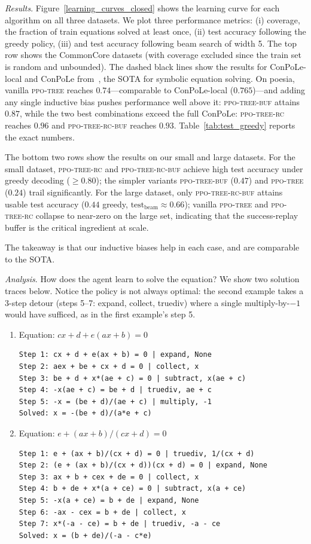 \documentclass{article}
\theoremstyle{plain}
\theoremstyle{definition}
\theoremstyle{remark}
\begin{document}
\textit{Results}. Figure~\ref{learning_curves_closed} shows the learning curve for each algorithm on all three datasets. We plot three performance metrics: (i) coverage, the fraction of train equations solved at least once, (ii) test accuracy following the greedy policy, (iii) and test accuracy following beam search of width 5. The top row shows the CommonCore datasets (with coverage excluded since the train set is random and unbounded). The dashed black lines show the results for ConPoLe-local and ConPoLe from~\cite{poesia2021contrastive}, the SOTA for symbolic equation solving. On poesia, vanilla \textsc{ppo-tree} reaches $0.74$---comparable to ConPoLe-local ($0.765$)---and adding any single inductive bias pushes performance well above it: \textsc{ppo-tree-buf} attains $0.87$, while the two best combinations exceed the full ConPoLe: \textsc{ppo-tree-rc} reaches $0.96$ and \textsc{ppo-tree-rc-buf} reaches $\mathbf{0.93}$. Table~\ref{tab:test_greedy} reports the exact numbers. 

The bottom two rows show the results on our small and large datasets. For the small dataset, \textsc{ppo-tree-rc} and \textsc{ppo-tree-rc-buf} achieve high test accuracy under greedy decoding ($\geq 0.80$); the simpler variants \textsc{ppo-tree-buf} ($0.47$) and \textsc{ppo-tree} ($0.24$) trail significantly. For the large dataset, only \textsc{ppo-tree-rc-buf} attains usable test accuracy ($0.44$ greedy, $\text{test}_{\text{beam}} \approx 0.66$); vanilla \textsc{ppo-tree} and \textsc{ppo-tree-rc} collapse to near-zero on the large set, indicating that the success-replay buffer is the critical ingredient at scale. 

The takeaway is that our inductive biases help in each case, and are comparable to the SOTA. 

\textit{Analysis}. How does the agent learn to solve the equation? We show two solution traces below. Notice the policy is not always optimal: the second example takes a 3-step detour (steps 5--7: expand, collect, truediv) where a single multiply-by-$-1$ would have sufficed, as in the first example's step 5. 
\begin{enumerate}
\item Equation: $c x + d + e(a x + b) = 0$
\begin{verbatim}
Step 1: cx + d + e(ax + b) = 0 | expand, None
Step 2: aex + be + cx + d = 0 | collect, x
Step 3: be + d + x*(ae + c) = 0 | subtract, x(ae + c)
Step 4: -x(ae + c) = be + d | truediv, ae + c
Step 5: -x = (be + d)/(ae + c) | multiply, -1
Solved: x = -(be + d)/(a*e + c)
\end{verbatim}
\item Equation: $e + (a x + b)/(c x + d) = 0$
\begin{verbatim}
Step 1: e + (ax + b)/(cx + d) = 0 | truediv, 1/(cx + d)
Step 2: (e + (ax + b)/(cx + d))(cx + d) = 0 | expand, None
Step 3: ax + b + cex + de = 0 | collect, x
Step 4: b + de + x*(a + ce) = 0 | subtract, x(a + ce)
Step 5: -x(a + ce) = b + de | expand, None
Step 6: -ax - cex = b + de | collect, x
Step 7: x*(-a - ce) = b + de | truediv, -a - ce
Solved: x = (b + de)/(-a - c*e)
\end{verbatim}
\end{enumerate}
\end{document}
